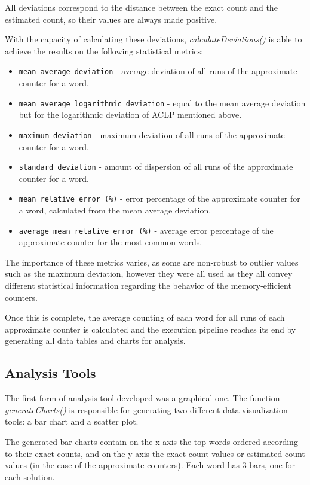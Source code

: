 \documentclass[shortpaper]{revdetua}
\begin{document}
All deviations correspond to the distance between the exact count and the 
estimated count, so their values are always made positive.

\newpage
With the capacity of calculating these deviations, \textit{calculateDeviations()} 
is able to achieve the results on the following statistical metrics: 

\begin{itemize}
    \item \texttt{mean average deviation} - average deviation of all runs of the approximate counter for a word.
    \item \texttt{mean average logarithmic deviation} - equal to the mean average deviation but for the logarithmic deviation of ACLP mentioned above.
    \item \texttt{maximum deviation} - maximum deviation of all runs of the approximate counter for a word.
    \item \texttt{standard deviation} - amount of dispersion of all runs of the approximate counter for a word.
    \item \texttt{mean relative error (\%)} - error percentage of the approximate counter for a word, calculated from the mean average deviation.
    \item \texttt{average mean relative error (\%)} - average error percentage of the approximate counter for the most common words.
\end{itemize}

The importance of these metrics varies, as some are non-robust to outlier values 
such as the maximum deviation, however they were all used as they all convey 
different statistical information regarding the behavior of the memory-efficient
counters.

Once this is complete, the average counting of each word for all runs of each
approximate counter is calculated and the execution pipeline reaches its end 
by generating all data tables and charts for analysis.

\subsection{Analysis Tools}

The first form of analysis tool developed was a graphical one.
The function \textit{generateCharts()} is responsible for generating two different
data visualization tools: a bar chart and a scatter plot.

The generated bar charts contain on the x axis the top words ordered according to
their exact counts, and on the y axis the exact count values or estimated count 
values (in the case of the approximate counters).
Each word has 3 bars, one for each solution.
\end{document}
